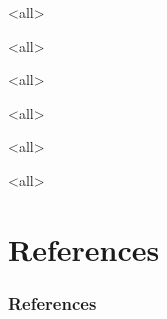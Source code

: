 \textbf{}
\begin{paracol}{2}

\begin{rightcolumn}

\newpage

\mode<all>

\mode*

\newpage

\mode<all>

\mode*

\clearpage

\mode<all>

\mode*

\clearpage

\mode<all>

\mode*

\clearpage

\mode<all>

\mode*

\mode<all>

\mode*


\section{References}
\begin{frame}[allowframebreaks] \frametitle{References}
	\scriptsize
	
	
\end{frame}

\end{rightcolumn}
\end{paracol}


